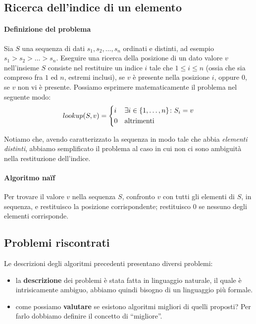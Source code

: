 \subsection{Ricerca dell'indice di un elemento}

\paragraph{Definizione del problema}
Sia \(S\) una sequenza di dati \(s_1, s_2, \dots, s_n\) ordinati e distinti, ad esempio \(s_1 > s_2 > \dots > s_n\).
Eseguire una ricerca della posizione di un dato valore \(v\) nell'insieme \(S\) consiste nel restituire un indice \(i\) tale che \(1 \leqslant i \leqslant n\) (ossia che sia compreso fra \(1\) ed \(n\), estremi inclusi), se \(v\) è presente nella posizione \(i\), oppure \(0\), se \(v\) non vi è presente.
Possiamo esprimere matematicamente il problema nel seguente modo:
\[
    lookup(S,v) =
    \begin{dcases}
        i & \exists i \in \{1, \dots, n\} \colon S_i = v\\
        0 & \text{altrimenti}\\
    \end{dcases}
\]

Notiamo che, avendo caratterizzato la sequenza in modo tale che abbia \emph{elementi distinti}, abbiamo semplificato il problema al caso in cui non ci sono ambiguità nella restituzione dell'indice.

\paragraph{Algoritmo na\"if}
Per trovare il valore \(v\) nella sequenza \(S\), confronto \(v\) con tutti gli elementi di \(S\), in sequenza, e restituisco la posizione corrispondente; restituisco \(0\) se nessuno degli elementi corrisponde.

\subsection{Problemi riscontrati}

Le descrizioni degli algoritmi precedenti presentano diversi problemi:
\begin{itemize}
    \item la \textbf{descrizione} dei problemi è stata fatta in linguaggio naturale, il quale è intrisicamente ambiguo, abbiamo quindi bisogno di un linguaggio più formale.
    \item come possiamo \textbf{valutare} se esistono algoritmi migliori di quelli proposti? Per farlo dobbiamo definire il concetto di \enquote{migliore}.
\end{itemize}

